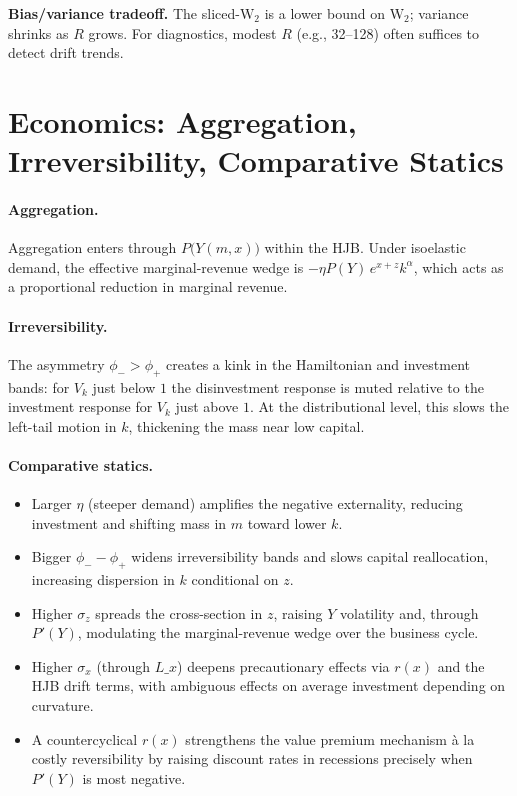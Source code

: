 ﻿\documentclass[11pt,letterpaper,oneside]{article}
\numberwithin{equation}{section}
\newcommand{\1}{\mathbf{1}}
\newcommand{\Lx}{L\_x}
\begin{document}
\begin{tcolorbox}[mathstyle]
\textbf{Bias/variance tradeoff.} The sliced-$\mathrm W_2$ is a lower bound on $\mathrm W_2$; variance shrinks as $R$ grows. For diagnostics, modest $R$ (e.g., 32--128) often suffices to detect drift trends.
\end{tcolorbox}

\section{Economics: Aggregation, Irreversibility, Comparative Statics}

\paragraph{Aggregation.}
Aggregation enters through $P\big(Y(m,x)\big)$ within the HJB. Under isoelastic demand, the effective marginal-revenue wedge is $-\eta P(Y)\,e^{x+z}k^\alpha$, which acts as a proportional reduction in marginal revenue.

\paragraph{Irreversibility.}
The asymmetry $\phi_->\phi_+$ creates a kink in the Hamiltonian and investment bands: for $V_k$ just below $1$ the disinvestment response is muted relative to the investment response for $V_k$ just above $1$. At the distributional level, this slows the left-tail motion in $k$, thickening the mass near low capital.

\paragraph{Comparative statics.}
\begin{itemize}[leftmargin=1.25em]
\item Larger $\eta$ (steeper demand) amplifies the negative externality, reducing investment and shifting mass in $m$ toward lower $k$.
\item Bigger $\phi_- - \phi_+$ widens irreversibility bands and slows capital reallocation, increasing dispersion in $k$ conditional on $z$.
\item Higher $\sigma_z$ spreads the cross-section in $z$, raising $Y$ volatility and, through $P'(Y)$, modulating the marginal-revenue wedge over the business cycle.
\item Higher $\sigma_x$ (through $\Lx$) deepens precautionary effects via $r(x)$ and the HJB drift terms, with ambiguous effects on average investment depending on curvature.
\item A countercyclical $r(x)$ strengthens the value premium mechanism à la costly reversibility by raising discount rates in recessions precisely when $P'(Y)$ is most negative.
\end{itemize}
\end{document}
